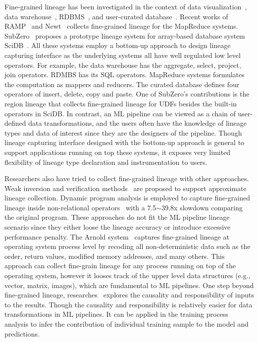 \documentclass{sig-alternate}
\begin{document}
Fine-grained lineage has been investigated in the context of data visualization~\cite{stonebraker93, woodruff97},  
data warehouse~\cite{cui00, cui03}, RDBMS~\cite{widom04}, and user-curated database~\cite{buneman06}.
Recent works of RAMP~\cite{ikeda11, park11} and Newt~\cite{logothetis13} collects fine-grained lineage for the MapReduce
systems. SubZero~\cite{wu13} proposes a prototype lineage system for array-based database system SciDB~\cite{brown10}.
All these systems employ a bottom-up approach to design lineage capturing interface as the underlying systems all have well regulated low level operators.
For example, the data warehouse has the aggregate, select, project, join operators. 
RDMBS has its SQL operators. MapReduce systems formulates the computation as mappers and reducers.
The curated database defines four operators of insert, delete, copy and paste.
One of SubZero's contributions is the region lineage that collects fine-grained lineage for UDFs besides the built-in operators in SciDB. 
In contrast, an ML pipeline can be viewed as a chain of user-defined data transformations, and the users often have the knowledge 
of lineage types and data of interest since they are the designers of the pipeline. 
Though lineage capturing interface designed with the bottom-up approach is general to support applications running on top these systems,
it exposes very limited flexibility of lineage type declaration and instrumentation to users.

Researchers also have tried to collect fine-grained lineage with other approaches.
Weak inversion and verification methods~\cite{woodruff97} are proposed to support approximate lineage collection.
Dynamic program analysis is employed to capture fine-grained lineage inside non-relational operators~\cite{zhang07} with 
a 7.5$\sim$39.8x slowdown comparing the original program. 
These approaches do not fit the ML pipeline lineage scenario since they either loose the lineage accuracy or introduce
excessive performance penalty.
The Arnold system~\cite{devecsery14} captures fine-grained lineage at operating system process level by recoding
all non-deterministic data such as the order, return values, modified memory addresses, and many others. 
This approach can collect fine-grain lineage for any process running on top of the operating system, however
it looses track of the upper level data structures (e.g., vector, matrix, images), which are fundamental to ML pipelines.
One step beyond fine-grained lineage, researches~\cite{meliou10, meliou11} explores the causality and responsibility
of inputs to the results. Though the causality and responsibility is relatively easier for data transformations in ML pipelines.
It can be applied in the training process analysis to infer the contribution of individual training sample to the model and predictions.
\end{document}
